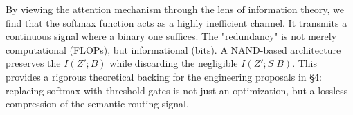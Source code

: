 By viewing the attention mechanism through the lens of information theory, we find that the softmax function acts as a highly inefficient channel. It transmits a continuous signal where a binary one suffices. The "redundancy" is not merely computational (FLOPs), but informational (bits). A NAND-based architecture preserves the $I(Z'; B)$ while discarding the negligible $I(Z'; S|B)$. This provides a rigorous theoretical backing for the engineering proposals in §4: replacing softmax with threshold gates is not just an optimization, but a lossless compression of the semantic routing signal.






























































